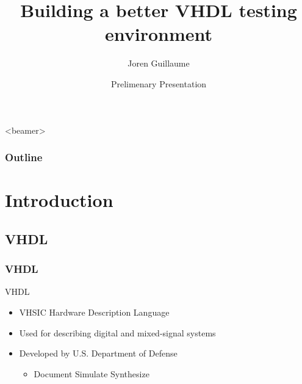 \documentclass[british,10pt]{beamer}
\title{Building a better VHDL testing environment}
\author[J. Guillaume]{Joren Guillaume}
\date[DEC'14, Gent]{Prelimenary Presentation}
\institute[Ghent University]
{
  FEA\\
  Ghent University
}
\begin{document}
\begin{frame}[plain]
  \titlepage
\end{frame}



\begin{frame}<beamer>\frametitle{Outline}
  \tableofcontents
\end{frame}

\section{Introduction}
\subsection{VHDL}

\begin{frame}\frametitle{VHDL}
VHDL
\begin{itemize}
\item VHSIC Hardware Description Language
\item Used for describing digital and mixed-signal systems 
\item Developed by U.S. Department of Defense
\begin{itemize}
\item Document  Simulate  Synthesize
\end{itemize}
\end{itemize}
\end{frame}
\end{document}
